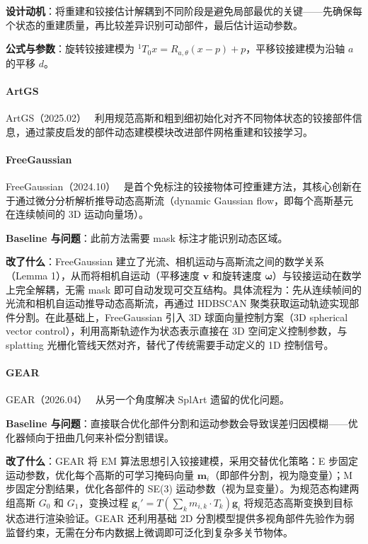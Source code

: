 \textbf{设计动机}：将重建和铰接估计解耦到不同阶段是避免局部最优的关键——先确保每个状态的重建质量，再比较差异识别可动部件，最后估计运动参数。

\textbf{公式与参数}：旋转铰接建模为 $^1T_0 x = R_{a,\theta}(x-p) + p$，平移铰接建模为沿轴 $a$ 的平移 $d$。

\paragraph{ArtGS}

ArtGS（2025.02）~\cite{2502_19459} 利用规范高斯和粗到细初始化对齐不同物体状态的铰接部件信息，通过蒙皮启发的部件动态建模模块改进部件网格重建和铰接学习。

\paragraph{FreeGaussian}

FreeGaussian（2024.10）~\cite{2410_22070} 是首个免标注的铰接物体可控重建方法，其核心创新在于通过微分分析解析推导动态高斯流（dynamic Gaussian flow，即每个高斯基元在连续帧间的 3D 运动向量场）。

\textbf{Baseline 与问题}：此前方法需要 mask 标注才能识别动态区域。

\textbf{改了什么}：FreeGaussian 建立了光流、相机运动与高斯流之间的数学关系（Lemma 1），从而将相机自运动（平移速度 $\mathbf{v}$ 和旋转速度 $\boldsymbol{\omega}$）与铰接运动在数学上完全解耦，无需 mask 即可自动发现可交互结构。具体流程为：先从连续帧间的光流和相机自运动推导动态高斯流，再通过 HDBSCAN 聚类获取运动轨迹实现部件分割。在此基础上，FreeGaussian 引入 3D 球面向量控制方案（3D spherical vector control），利用高斯轨迹作为状态表示直接在 3D 空间定义控制参数，与 splatting 光栅化管线天然对齐，替代了传统需要手动定义的 1D 控制信号。

\paragraph{GEAR}

GEAR（2026.04）~\cite{2604_07728} 从另一个角度解决 SplArt 遗留的优化问题。

\textbf{Baseline 与问题}：直接联合优化部件分割和运动参数会导致误差归因模糊——优化器倾向于扭曲几何来补偿分割错误。

\textbf{改了什么}：GEAR 将 EM 算法思想引入铰接建模，采用交替优化策略：E 步固定运动参数，优化每个高斯的可学习掩码向量 $\mathbf{m}_i$（即部件分割，视为隐变量）；M 步固定分割结果，优化各部件的 SE(3) 运动参数（视为显变量）。为规范态构建两组高斯 $G_0$ 和 $G_1$，变换过程 $\mathbf{g}_i' = T(\sum_k m_{i,k} \cdot T_k)\mathbf{g}_i$ 将规范态高斯变换到目标状态进行渲染验证。GEAR 还利用基础 2D 分割模型提供多视角部件先验作为弱监督约束，无需在分布内数据上微调即可泛化到复杂多关节物体。

